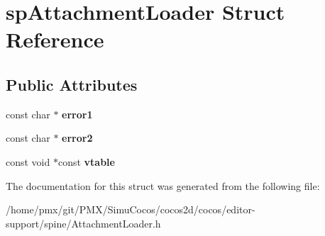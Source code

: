 \hypertarget{structspAttachmentLoader}{}\section{sp\+Attachment\+Loader Struct Reference}
\label{structspAttachmentLoader}
\subsection*{Public Attributes}
\begin{DoxyCompactItemize}
\item 
\mbox{\label{structspAttachmentLoader_a9835c474a6eb25f6bce72142b22da463}} 
const char $\ast$ {\bfseries error1}
\item 
\mbox{\label{structspAttachmentLoader_aed30d7efaa3b2aaf8fb422e4ddc7ee6e}} 
const char $\ast$ {\bfseries error2}
\item 
\mbox{\label{structspAttachmentLoader_a783c49ffc53635f324919f7f5ad3c77d}} 
const void $\ast$const {\bfseries vtable}
\end{DoxyCompactItemize}


The documentation for this struct was generated from the following file\+:\begin{DoxyCompactItemize}
\item 
/home/pmx/git/\+P\+M\+X/\+Simu\+Cocos/cocos2d/cocos/editor-\/support/spine/Attachment\+Loader.\+h\end{DoxyCompactItemize}
